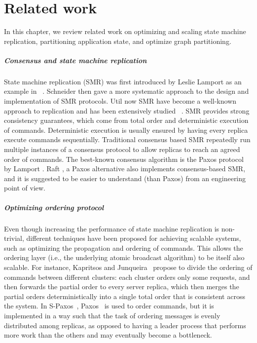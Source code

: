 \chapter[Related work]{Related work}
\label{sec:rw}

In this chapter, we review related work on optimizing and scaling state machine
replication, partitioning application state, and optimize graph partitioning.

\paragraph{Consensus and state machine replication}
State machine replication (SMR) was first introduced by Leslie Lamport as an
example in ~\cite{Lam78}. Schneider \cite{Sch90} then gave a more systematic
approach to the design and implementation of SMR protocols. Util now SMR have
become a well-known approach to replication and has been extensively studied
~\cite{Kapritsos:2012um, Kotla:2004ep, santos2013htsmr}. SMR provides strong
consistency guarantees, which come from total order and deterministic execution
of commands. Deterministic execution is usually ensured by having every replica
execute commands sequentially. Traditional consensus based SMR repeatedly run
multiple instances of a consensus protocol to allow replicas to reach an agreed
order of commands. The best-known consensus algorithm is the Paxos protocol by
Lamport \cite{Lam98}. Raft \cite{184040}, a Paxos alternative also
implements consensus-based SMR, and it is suggested to be easier to understand
(than Paxos) from an engineering point of view.

\paragraph{Optimizing ordering protocol}

Even though increasing the performance of state machine replication is
non-trivial, different techniques have been proposed for achieving scalable
systems, such as optimizing the propagation and ordering of commands. This
allows the ordering layer (i.e., the underlying atomic broadcast algorithm) to
be itself also scalable. For instance, Kapritsos and
Junqueira~\cite{kapritsos2010scalable} propose to divide the ordering of
commands between different clusters: each cluster orders only some requests, and
then forwards the partial order to every server replica, which then merges the
partial orders deterministically into a single total order that is consistent
across the system. In S-Paxos~\cite{biely2012spaxos}, Paxos~\cite{Lam98} is used
to order commands, but it is implemented in a way such that the task of ordering
messages is evenly distributed among replicas, as opposed to having a leader
process that performs more work than the others and may eventually become a
bottleneck.

